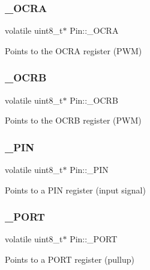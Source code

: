 \subsubsection{\texorpdfstring{\+\_\+\+O\+C\+RA}{\_OCRA}}
{\footnotesize\ttfamily volatile uint8\+\_\+t$\ast$ Pin\+::\+\_\+\+O\+C\+RA}



Points to the O\+C\+RA register (P\+WM) 

\mbox{\label{structPin_ad99c326bebfcc9f780b9590aaeb04f68}} 
\subsubsection{\texorpdfstring{\+\_\+\+O\+C\+RB}{\_OCRB}}
{\footnotesize\ttfamily volatile uint8\+\_\+t$\ast$ Pin\+::\+\_\+\+O\+C\+RB}



Points to the O\+C\+RB register (P\+WM) 

\mbox{\label{structPin_a22fa2dd8e8f6f82d434536ea9e517b91}} 
\subsubsection{\texorpdfstring{\+\_\+\+P\+IN}{\_PIN}}
{\footnotesize\ttfamily volatile uint8\+\_\+t$\ast$ Pin\+::\+\_\+\+P\+IN}



Points to a P\+IN register (input signal) 

\mbox{\label{structPin_a7ad2ae81751a3dd6e0ef0241a226b5bf}} 
\subsubsection{\texorpdfstring{\+\_\+\+P\+O\+RT}{\_PORT}}
{\footnotesize\ttfamily volatile uint8\+\_\+t$\ast$ Pin\+::\+\_\+\+P\+O\+RT}



Points to a P\+O\+RT register (pullup) 

\mbox{\label{structPin_a2fedb759a2179270a390e2020d001f85}} 
